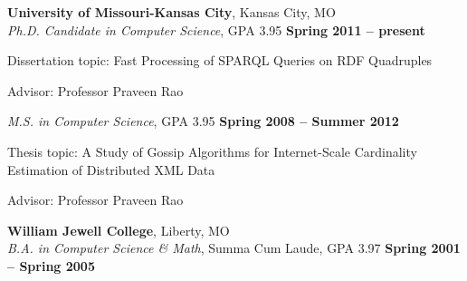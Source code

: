 \documentclass[margin,line]{resume}
\begin{document}
\begin{resume}
    \textbf{University of Missouri-Kansas City}, Kansas City, MO\\
    \textsl{Ph.D. Candidate in Computer Science}, GPA 3.95 \hfill \textbf{Spring 2011 -- present}\vspace{-3mm}\\\vspace{-1mm}%
    \vspace{1mm}
    \begin{list3}
        \item Dissertation topic: Fast Processing of SPARQL Queries on RDF Quadruples
        \item Advisor:  Professor Praveen Rao
    \end{list3}\vspace{-1.5mm}
    \textsl{M.S. in Computer Science}, GPA 3.95 \hfill \textbf{Spring 2008 -- Summer 2012}\vspace{-3mm}\\\vspace{-1mm}%
    \vspace{1mm}
    \begin{list3}
        \item Thesis topic: A Study of Gossip Algorithms for Internet-Scale Cardinality Estimation of Distributed XML Data
        \item Advisor:  Professor Praveen Rao
    \end{list3}\vspace{-1.5mm}
    \textbf{William Jewell College}, Liberty, MO\\
    \textsl{B.A. in Computer Science \& Math}, Summa Cum Laude, GPA 3.97 \hfill \textbf{Spring 2001 -- Spring 2005}\vspace{-3mm}\\\vspace{-1mm}%


\end{resume}
\end{document}
